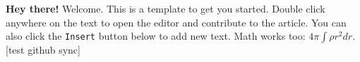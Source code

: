 \textbf{Hey there!} Welcome. This is a template to get you started. Double click anywhere on the text to open the editor and contribute to the article. You can also click the \verb|Insert| button below to add new text. Math works too: $4 \pi \int \rho r^2 dr$. [test github sync]